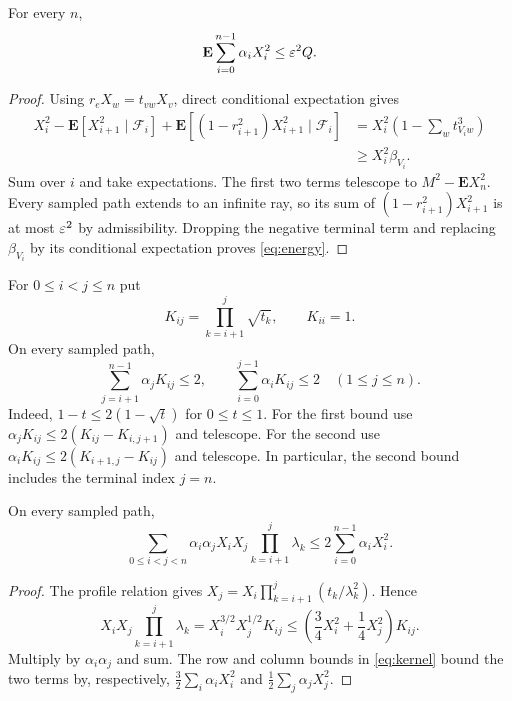 \begin{lemma}\label{lem:energy}
For every $n$,
\begin{equation}\label{eq:energy}
 \mathbf E\sum_{i=0}^{n-1}\alpha_iX_i^2\leq\varepsilon^2Q.
\end{equation}
\end{lemma}
\begin{proof}
Using $r_eX_w=t_{vw}X_v$, direct conditional expectation gives
\begin{align*}
 X_i^2-\mathbf E[X_{i+1}^2\mid\mathcal F_i]
 +\mathbf E[(1-r_{i+1}^2)X_{i+1}^2\mid\mathcal F_i]
 &=X_i^2\left(1-\sum_wt_{V_iw}^3\right)\\
 &\geq X_i^2\beta_{V_i}.
\end{align*}
Sum over $i$ and take expectations. The first two terms telescope
to $M^2-\mathbf E X_n^2$. Every sampled path extends to an infinite
ray, so its sum of $(1-r_{i+1}^2)X_{i+1}^2$ is at most
$\varepsilon^2$ by admissibility. Dropping the negative terminal term
and replacing $\beta_{V_i}$ by its conditional expectation proves
\eqref{eq:energy}.
\end{proof}

For $0\leq i<j\leq n$ put
\[
 K_{ij}=\prod_{k=i+1}^j\sqrt{t_k},\qquad K_{ii}=1.
\]
On every sampled path,
\begin{equation}\label{eq:kernel}
 \sum_{j=i+1}^{n-1}\alpha_jK_{ij}\leq2,
 \qquad
 \sum_{i=0}^{j-1}\alpha_iK_{ij}\leq2\quad(1\leq j\leq n).
\end{equation}
Indeed, $1-t\leq2(1-\sqrt t)$ for $0\leq t\leq1$.
For the first bound use
$\alpha_jK_{ij}\leq2(K_{ij}-K_{i,j+1})$ and telescope.
For the second use
$\alpha_iK_{ij}\leq2(K_{i+1,j}-K_{ij})$ and telescope.
In particular, the second bound includes the terminal index $j=n$.

\begin{lemma}\label{lem:double}
On every sampled path,
\begin{equation}\label{eq:double}
 \sum_{0\leq i<j<n}\alpha_i\alpha_jX_iX_j
                       \prod_{k=i+1}^j\lambda_k
 \leq2\sum_{i=0}^{n-1}\alpha_iX_i^2.
\end{equation}
\end{lemma}
\begin{proof}
The profile relation gives
$X_j=X_i\prod_{k=i+1}^j(t_k/\lambda_k^2)$. Hence
\[
 X_iX_j\prod_{k=i+1}^j\lambda_k
 =X_i^{3/2}X_j^{1/2}K_{ij}
 \leq\left(\frac34X_i^2+\frac14X_j^2\right)K_{ij}.
\]
Multiply by $\alpha_i\alpha_j$ and sum. The row and column
bounds in \eqref{eq:kernel} bound the two terms by, respectively,
$\tfrac32\sum_i\alpha_iX_i^2$ and
$\tfrac12\sum_j\alpha_jX_j^2$.
\end{proof}

